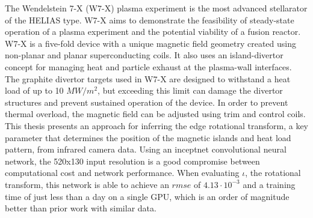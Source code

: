 %
\label{sec:abstract}

The Wendelstein 7-X (W7-X) plasma experiment is the most advanced stellarator of the HELIAS type. W7-X aims to demonstrate the feasibility of steady-state operation of a plasma experiment and the potential viability of a fusion reactor. W7-X is a five-fold device with a unique magnetic field geometry created using non-planar and planar superconducting coils. It also uses an island-divertor concept for managing heat and particle exhaust at the plasma-wall interfaces. The graphite divertor targets used in W7-X are designed to withstand a heat load of up to 10 $MW/m^2$, but exceeding this limit can damage the divertor structures and prevent sustained operation of the device. In order to prevent thermal overload, the magnetic field can be adjusted using trim and control coils. This thesis presents an approach for inferring the edge rotational transform, a key parameter that determines the position of the magnetic islands and heat load pattern, from infrared camera data. Using an inceptnet convolutional neural network, the 520x130 input resolution is a good compromise between computational cost and network performance. When evaluating $\iota$, the rotational transform, this network is able to achieve an $rmse$ of $4.13 \cdot 10^{-3}$ and a training time of just less than a day on a single GPU, which is an order of magnitude better than prior work with similar data.